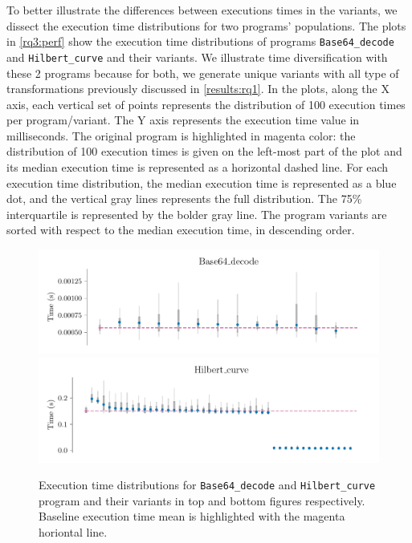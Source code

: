 To better illustrate the differences between executions times in the variants, we dissect the execution time distributions for two programs' populations. 
The plots in \autoref{rq3:perf} show the execution time distributions of programs \texttt{Base64\_decode} and \texttt{Hilbert\_curve} and their variants. 
We illustrate time diversification with these 2 programs because for both, we generate unique variants with all type of transformations previously discussed in \autoref{results:rq1}.
In the plots, along the X axis, each vertical set of points represents the distribution of 100 execution times per program/variant. The Y axis represents the execution time value in milliseconds. The original program is highlighted in magenta color: the distribution of 100 execution times is given on the left-most part of the plot and its median execution time is represented as a horizontal dashed line. For each execution time distribution, the median execution time is represented as a blue dot, and the vertical gray lines represents the full distribution. The 75\% interquartile is represented by the bolder gray line. The program variants are sorted with respect to the median execution time, in descending order.



\begin{figure}[h]
    \centering
    \includegraphics[width=\linewidth]{plots/base64.pdf}
    \includegraphics[width=\linewidth]{plots/hilbert_curve.pdf}
    \caption{Execution time distributions for \texttt{Base64\_decode} and \texttt{Hilbert\_curve} program and their variants in top and bottom figures respectively. Baseline execution time mean is highlighted with the magenta horiontal line. }
    \label{rq3:perf}
\end{figure}

